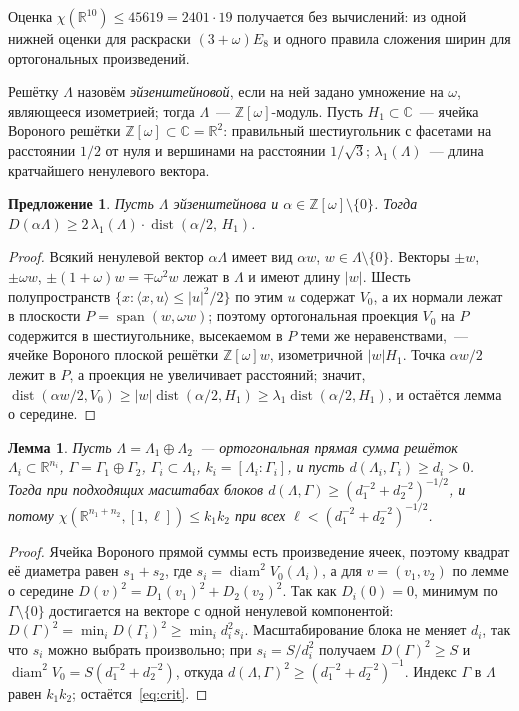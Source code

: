 \documentclass{article}
\theoremstyle{plain}
\newtheorem{proposition}{Предложение}
\newtheorem{lemma}{Лемма}
\theoremstyle{remark}
\newcommand{\R}{\mathbb{R}}
\newcommand{\Z}{\mathbb{Z}}
\newcommand{\CC}{\mathbb{C}}
\newcommand{\diam}{\operatorname{diam}}
\newcommand{\dist}{\operatorname{dist}}
\begin{document}
Оценка $\chi(\R^{10})\le45619=2401\cdot19$ получается без вычислений: из
одной нижней оценки для раскраски $(3+\omega)E_8$ и одного правила сложения
ширин для ортогональных произведений.

Решётку $\Lambda$ назовём \emph{эйзенштейновой}, если на ней задано
умножение на $\omega$, являющееся изометрией; тогда $\Lambda$~---
$\Z[\omega]$-модуль. Пусть $H_1\subset\CC$~--- ячейка Вороного решётки
$\Z[\omega]\subset\CC=\R^2$: правильный шестиугольник с фасетами на
расстоянии $1/2$ от нуля и вершинами на расстоянии $1/\sqrt3$;
$\lambda_1(\Lambda)$~--- длина кратчайшего ненулевого вектора.

\begin{proposition}\label{prop:planar}
Пусть $\Lambda$ эйзенштейнова и $\alpha\in\Z[\omega]\setminus\{0\}$. Тогда
$D(\alpha\Lambda)\ge2\,\lambda_1(\Lambda)\cdot\dist(\alpha/2,\,H_1)$.
\end{proposition}

\begin{proof}
Всякий ненулевой вектор $\alpha\Lambda$ имеет вид $\alpha w$,
$w\in\Lambda\setminus\{0\}$. Векторы $\pm w$, $\pm\omega w$,
$\pm(1+\omega)w=\mp\omega^2w$ лежат в $\Lambda$ и имеют длину $|w|$. Шесть
полупространств $\{x:\langle x,u\rangle\le|u|^2/2\}$ по этим $u$ содержат
$V_0$, а их нормали лежат в плоскости $P=\operatorname{span}(w,\omega w)$;
поэтому ортогональная проекция $V_0$ на $P$ содержится в шестиугольнике,
высекаемом в $P$ теми же неравенствами,~--- ячейке Вороного плоской решётки
$\Z[\omega]w$, изометричной $|w|H_1$. Точка $\alpha w/2$ лежит в $P$, а
проекция не увеличивает расстояний; значит,
$\dist(\alpha w/2,V_0)\ge|w|\dist(\alpha/2,H_1)\ge\lambda_1\dist(\alpha/2,H_1)$,
и остаётся лемма о середине.
\end{proof}

\begin{lemma}\label{lem:prod}
Пусть $\Lambda=\Lambda_1\oplus\Lambda_2$~--- ортогональная прямая сумма
решёток $\Lambda_i\subset\R^{n_i}$, $\Gamma=\Gamma_1\oplus\Gamma_2$,
$\Gamma_i\subset\Lambda_i$, $k_i=[\Lambda_i:\Gamma_i]$, и пусть
$d(\Lambda_i,\Gamma_i)\ge d_i>0$. Тогда при подходящих масштабах блоков
$d(\Lambda,\Gamma)\ge(d_1^{-2}+d_2^{-2})^{-1/2}$, и потому
$\chi(\R^{n_1+n_2},[1,\ell])\le k_1k_2$ при всех
$\ell<(d_1^{-2}+d_2^{-2})^{-1/2}$.
\end{lemma}

\begin{proof}
Ячейка Вороного прямой суммы есть произведение ячеек, поэтому квадрат её
диаметра равен $s_1+s_2$, где $s_i=\diam^2V_0(\Lambda_i)$, а для
$v=(v_1,v_2)$ по лемме о середине $D(v)^2=D_1(v_1)^2+D_2(v_2)^2$. Так как
$D_i(0)=0$, минимум по $\Gamma\setminus\{0\}$ достигается на векторе с одной
ненулевой компонентой: $D(\Gamma)^2=\min_iD(\Gamma_i)^2\ge\min_id_i^2s_i$.
Масштабирование блока не меняет $d_i$, так что $s_i$ можно выбрать
произвольно; при $s_i=S/d_i^2$ получаем $D(\Gamma)^2\ge S$ и
$\diam^2V_0=S(d_1^{-2}+d_2^{-2})$, откуда
$d(\Lambda,\Gamma)^2\ge(d_1^{-2}+d_2^{-2})^{-1}$. Индекс $\Gamma$ в $\Lambda$
равен $k_1k_2$; остаётся~\eqref{eq:crit}.
\end{proof}
\end{document}
